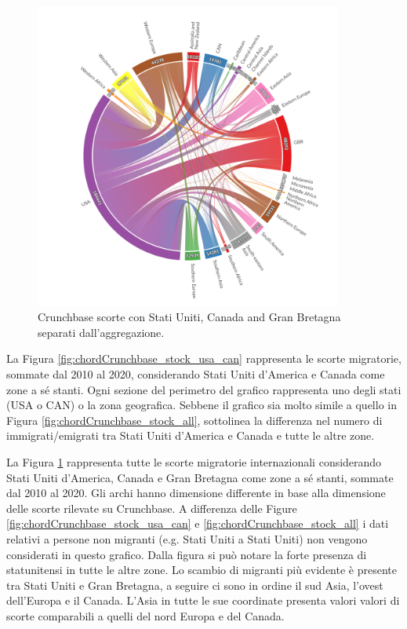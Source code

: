 \begin{figure}[htbp]
    \centering
    \includegraphics[width=0.9\textwidth]{images/SVG/Chords/stocks/stock_chord_USA_CAN_GBR_separate.png}
    \caption{Crunchbase scorte con Stati Uniti, Canada and Gran Bretagna separati dall'aggregazione.}
    \label{fig:chordCrunchbase_stock_usa_can_gbr}
\end{figure}

La Figura \ref{fig:chordCrunchbase_stock_usa_can} rappresenta le scorte migratorie, sommate dal 2010 al 2020, considerando Stati Uniti d'America e Canada come zone a sé stanti. Ogni sezione del perimetro del grafico rappresenta uno degli stati (USA o CAN) o la zona geografica.
Sebbene il grafico sia molto simile a quello in Figura \ref{fig:chordCrunchbase_stock_all}, sottolinea la differenza nel numero di immigrati/emigrati tra Stati Uniti d'America e Canada e tutte le altre zone. 


La Figura \ref{fig:chordCrunchbase_stock_usa_can_gbr} rappresenta tutte le scorte migratorie internazionali considerando Stati Uniti d'America, Canada e Gran Bretagna come zone a sé stanti, sommate dal 2010 al 2020. Gli archi hanno dimensione differente in base alla dimensione delle scorte rilevate su Crunchbase.  A differenza delle Figure \ref{fig:chordCrunchbase_stock_usa_can} e \ref{fig:chordCrunchbase_stock_all} i dati relativi a persone non migranti (e.g. Stati Uniti a Stati Uniti) non vengono considerati in questo grafico. Dalla figura si può notare la forte presenza di statunitensi in tutte le altre zone. Lo scambio di migranti più evidente è presente tra Stati Uniti e Gran Bretagna, a seguire ci sono in ordine il sud Asia, l'ovest dell'Europa e il Canada. L'Asia in tutte le sue coordinate presenta valori valori di scorte comparabili a quelli del nord Europa e del Canada.
\FloatBarrier

